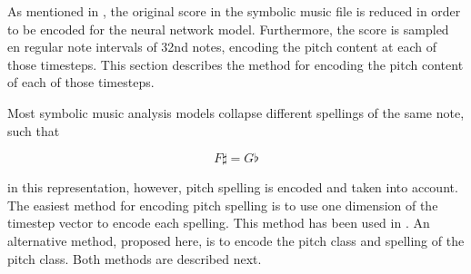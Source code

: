 
As mentioned in , the original
score in the symbolic music file is reduced in order to be
encoded for the neural network model. Furthermore, the score
is sampled en regular note intervals of 32nd notes, encoding
the pitch content at each of those timesteps. This section
describes the method for encoding the pitch content of each
of those timesteps. 

Most symbolic music analysis models collapse different
spellings of the same note, such that 

$$F\sharp = G\flat$$

in this representation, however, pitch spelling is encoded
and taken into account. The easiest method for encoding
pitch spelling is to use one dimension of the timestep
vector to encode each spelling. This method has been used in
\textcite{micchi2020not, micchi2021deep}. An alternative
method, proposed here, is to encode the pitch class and
spelling of the pitch class. Both methods are described
next.